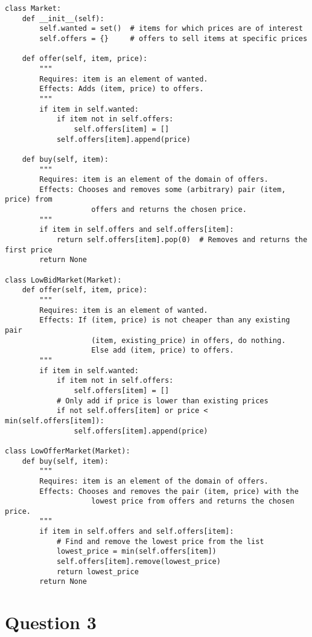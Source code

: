 \documentclass[10pt]{article}
\begin{document}
\begin{lstlisting}
class Market:
    def __init__(self):
        self.wanted = set()  # items for which prices are of interest
        self.offers = {}     # offers to sell items at specific prices

    def offer(self, item, price):
        """
        Requires: item is an element of wanted.
        Effects: Adds (item, price) to offers.
        """
        if item in self.wanted:
            if item not in self.offers:
                self.offers[item] = []
            self.offers[item].append(price)

    def buy(self, item):
        """
        Requires: item is an element of the domain of offers.
        Effects: Chooses and removes some (arbitrary) pair (item, price) from
                    offers and returns the chosen price.
        """
        if item in self.offers and self.offers[item]:
            return self.offers[item].pop(0)  # Removes and returns the first price
        return None

class LowBidMarket(Market):
    def offer(self, item, price):
        """
        Requires: item is an element of wanted.
        Effects: If (item, price) is not cheaper than any existing pair
                    (item, existing_price) in offers, do nothing.
                    Else add (item, price) to offers.
        """
        if item in self.wanted:
            if item not in self.offers:
                self.offers[item] = []
            # Only add if price is lower than existing prices
            if not self.offers[item] or price < min(self.offers[item]):
                self.offers[item].append(price)

class LowOfferMarket(Market):
    def buy(self, item):
        """
        Requires: item is an element of the domain of offers.
        Effects: Chooses and removes the pair (item, price) with the 
                    lowest price from offers and returns the chosen price.
        """
        if item in self.offers and self.offers[item]:
            # Find and remove the lowest price from the list
            lowest_price = min(self.offers[item])
            self.offers[item].remove(lowest_price)
            return lowest_price
        return None                
\end{lstlisting}

\newpage
\section{Question 3}
\end{document}
